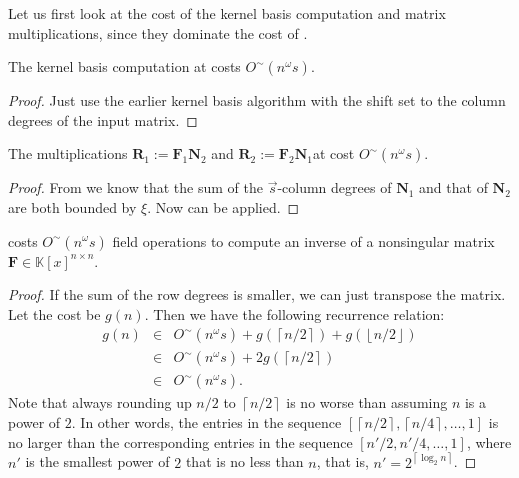 Let us first look at the cost of the kernel basis computation and
matrix multiplications, since they dominate the cost of . 
\begin{lem}
The kernel basis computation at 
costs $O^{\sim}(n^{\omega}s)$.\end{lem}
\begin{proof}
Just use the earlier kernel basis algorithm with the shift set to
the column degrees of the input matrix.\end{proof}
\begin{lem}
The multiplications $\mathbf{R}_{1}:=\mathbf{F}_{1}\mathbf{N}_{2}$
and $\mathbf{R}_{2}:=\mathbf{F}_{2}\mathbf{N}_{1}$at 
cost $O^{\sim}(n^{\omega}s)$.\end{lem}
\begin{proof}
From  we know
that the sum of the $\vec{s}$-column degrees of $\mathbf{N}_{1}$
and that of $\mathbf{N}_{2}$ are both bounded by $\xi$. Now 
can be applied.\end{proof}
\begin{thm}
\label{thm:inverseCost} costs $O^{\sim}\left(n^{\omega}s\right)$
field operations to compute an inverse of a nonsingular matrix $\mathbf{F}\in\mathbb{K}\left[x\right]^{n\times n}$.\end{thm}
\begin{proof}
If the sum of the row degrees is smaller, we can just transpose the
matrix. Let the cost be $g(n)$. Then we have the following recurrence
relation:
\begin{eqnarray*}
g(n) & \in & O^{\sim}(n^{\omega}s)+g(\left\lceil n/2\right\rceil )+g(\left\lfloor n/2\right\rfloor )\\
 & \in & O^{\sim}(n^{\omega}s)+2g(\left\lceil n/2\right\rceil )\\
 & \in & O^{\sim}(n^{\omega}s).
\end{eqnarray*}
 Note that always rounding up $n/2$ to $\left\lceil n/2\right\rceil $
is no worse than assuming $n$ is a power of $2$. In other words,
the entries in the sequence $\left[\left\lceil n/2\right\rceil ,\left\lceil n/4\right\rceil ,\dots,1\right]$
is no larger than the corresponding entries in the sequence $\left[n'/2,n'/4,\dots,1\right]$,
where $n'$ is the smallest power of $2$ that is no less than $n$,
that is, $n'=2^{\left\lceil \log_{2}n\right\rceil }$. \end{proof}
